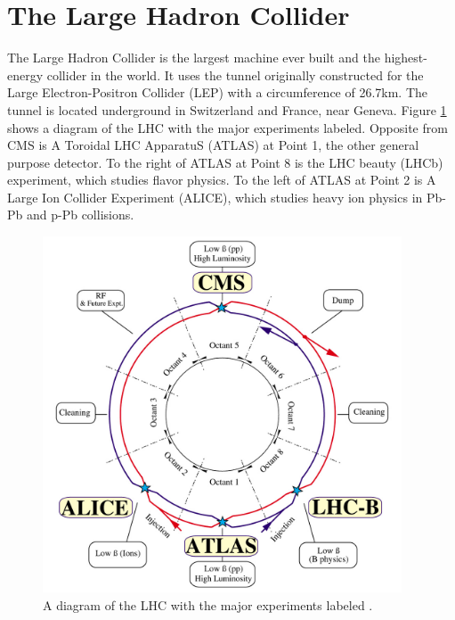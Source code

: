\section{The Large Hadron Collider}

The Large Hadron Collider is the largest machine ever built and the highest-energy collider in the world. It uses the tunnel originally constructed for the Large Electron-Positron Collider (LEP) with a circumference of 26.7\unit{km}. The tunnel is located underground in Switzerland and France, near Geneva. Figure \ref{fig:lhc-diagram} shows a diagram of the LHC with the major experiments labeled. Opposite from CMS is A Toroidal LHC ApparatuS (ATLAS) at Point 1, the other general purpose detector. To the right of ATLAS at Point 8 is the LHC beauty (LHCb) experiment, which studies flavor physics. To the left of ATLAS at Point 2 is A Large Ion Collider Experiment (ALICE), which studies heavy ion physics in Pb-Pb and p-Pb collisions.

\begin{figure}[hbt]
\begin{center}
\includegraphics[width=0.95\textwidth]{figures/lhc-pho-1997-060.png}
\caption{A diagram of the LHC with the major experiments labeled \cite{Jean-Luc:841573}.}
\label{fig:lhc-diagram}
\end{center}
\end{figure}

